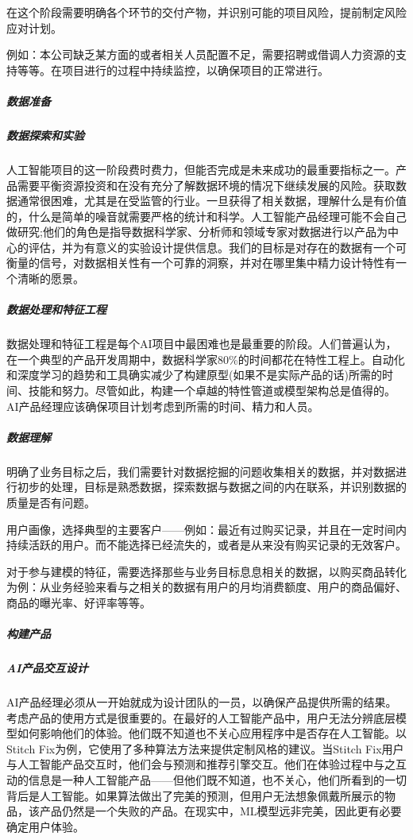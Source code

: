 \documentclass[letterpaper,10pt,english]{sphinxmanual}
\begin{document}
在这个阶段需要明确各个环节的交付产物，并识别可能的项目风险，提前制定风险应对计划。

例如：本公司缺乏某方面的或者相关人员配置不足，需要招聘或借调人力资源的支持等等。在项目进行的过程中持续监控，以确保项目的正常进行。


\subparagraph{数据准备}
\label{\detokenize{chapter_project/process:id18}}

\subparagraph{数据探索和实验}
\label{\detokenize{chapter_project/process:id19}}
人工智能项目的这一阶段费时费力，但能否完成是未来成功的最重要指标之一。产品需要平衡资源投资和在没有充分了解数据环境的情况下继续发展的风险。获取数据通常很困难，尤其是在受监管的行业。一旦获得了相关数据，理解什么是有价值的，什么是简单的噪音就需要严格的统计和科学。人工智能产品经理可能不会自己做研究;他们的角色是指导数据科学家、分析师和领域专家对数据进行以产品为中心的评估，并为有意义的实验设计提供信息。我们的目标是对存在的数据有一个可衡量的信号，对数据相关性有一个可靠的洞察，并对在哪里集中精力设计特性有一个清晰的愿景。


\subparagraph{数据处理和特征工程}
\label{\detokenize{chapter_project/process:id20}}
数据处理和特征工程是每个AI项目中最困难也是最重要的阶段。人们普遍认为，在一个典型的产品开发周期中，数据科学家80\%的时间都花在特性工程上。自动化和深度学习的趋势和工具确实减少了构建原型(如果不是实际产品的话)所需的时间、技能和努力。尽管如此，构建一个卓越的特性管道或模型架构总是值得的。AI产品经理应该确保项目计划考虑到所需的时间、精力和人员。


\subparagraph{数据理解}
\label{\detokenize{chapter_project/process:id21}}
明确了业务目标之后，我们需要针对数据挖掘的问题收集相关的数据，并对数据进行初步的处理，目标是熟悉数据，探索数据与数据之间的内在联系，并识别数据的质量是否有问题。

用户画像，选择典型的主要客户——例如：最近有过购买记录，并且在一定时间内持续活跃的用户。而不能选择已经流失的，或者是从来没有购买记录的无效客户。

对于参与建模的特征，需要选择那些与业务目标息息相关的数据，以购买商品转化为例：从业务经验来看与之相关的数据有用户的月均消费额度、用户的商品偏好、商品的曝光率、好评率等等。


\subparagraph{构建产品}
\label{\detokenize{chapter_project/process:id22}}

\subparagraph{AI产品交互设计}
\label{\detokenize{chapter_project/process:ai}}
AI产品经理必须从一开始就成为设计团队的一员，以确保产品提供所需的结果。考虑产品的使用方式是很重要的。在最好的人工智能产品中，用户无法分辨底层模型如何影响他们的体验。他们既不知道也不关心应用程序中是否存在人工智能。以Stitch
Fix为例，它使用了多种算法方法来提供定制风格的建议。当Stitch
Fix用户与人工智能产品交互时，他们会与预测和推荐引擎交互。他们在体验过程中与之互动的信息是一种人工智能产品——但他们既不知道，也不关心，他们所看到的一切背后是人工智能。如果算法做出了完美的预测，但用户无法想象佩戴所展示的物品，该产品仍然是一个失败的产品。在现实中，ML模型远非完美，因此更有必要确定用户体验。
\end{document}
